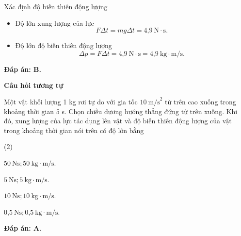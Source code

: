 \begin{dang}{Xác định độ biến thiên động lượng}
{		\begin{itemize}
			\item Độ lớn xung lượng của lực
			\begin{equation*}
				F \Delta t = mg \Delta t = \text{4,9}\ \text{N}\cdot \text{s}.
			\end{equation*}
			\item Độ lớn độ biến thiên động lượng 
			\begin{equation*}
				\Delta p =F \Delta t = \text{4,9}\ \text{N}\cdot \text{s}=\text{4,9}\ \text{kg} \cdot \text{m/s}.
			\end{equation*}
		\end{itemize}
		
		\textbf{Đáp án: B.}
		
		\begin{center}
			\textbf{Câu hỏi tương tự}
		\end{center}
		
		Một vật khối lượng 1 kg rơi tự do với gia tốc $\text{10}\ \text{m/s}^2$ từ trên cao xuống trong khoảng thời gian 5 s. Chọn chiều dương hướng thẳng đứng từ trên xuống. Khi đó, xung lượng của lực tác dụng lên vật và độ biến thiên động lượng của vật trong khoảng thời gian nói trên có độ lớn bằng
		\begin{mcq}(2)
			\item $50\ \text{N} \text{s}; 50\ \text{kg} \cdot \text{m/s}$.
			\item $\text{5}\ \text{N} \text{s}; \text{5}\ \text{kg} \cdot \text{m/s}$.
			\item $10\ \text{N} \text{s}; 10\ \text{kg} \cdot \text{m/s}$.
			\item $\text{0,5}\ \text{N} \text{s}; \text{0,5}\ \text{kg} \cdot \text{m/s}$.
		\end{mcq}
		
		\textbf{Đáp án: A}.
	}
\end{dang}

